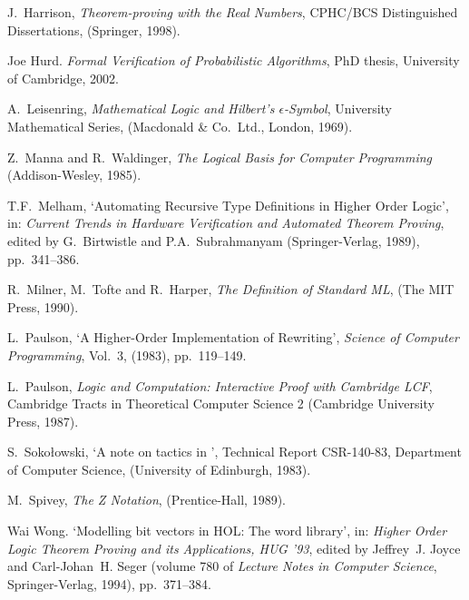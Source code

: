 \begin{thebibliography}{99}
J.\ Harrison,
{\it Theorem-proving with the Real Numbers},
{\rm CPHC/BCS Distinguished Dissertations},
(Springer, 1998).

Joe Hurd.
{\it Formal Verification of Probabilistic Algorithms},
{\rm PhD thesis, University of Cambridge, 2002}.

A.\ Leisenring,
{\it Mathematical Logic and Hilbert's $\epsilon$-Symbol\/},
{\rm University Mathematical Series},
(Macdonald \& Co.\ Ltd., London, 1969).

Z.\ Manna and R.\ Waldinger,
{\it The Logical Basis for Computer Programming\/}
(Addison-Wesley, 1985).

T{}.F{}.\ Melham, `{}Automating Recursive Type Definitions
in Higher Order Logic',
in: {\it Current Trends in Hardware Verification and
Automated Theorem Proving\/}, edited by G.\ Birtwistle
and P.A.\ Subrahmanyam
(Springer-Verlag, 1989), pp.\ 341--386.

R.\ Milner, M.\ Tofte and R.\ Harper,
{\it The Definition of Standard ML\/},
(The MIT Press, 1990).

L.\ Paulson,
`{}A Higher-Order Implementation of Rewriting',
{\it Science of Computer Programming}, Vol.\ 3, (1983), pp.\ 119--149.

 L.\ Paulson,
{\it Logic and Computation: Interactive Proof with Cambridge LCF},
Cambridge Tracts in Theoretical Computer Science 2
(Cambridge University Press, 1987).

%
S.\ Soko\l owski, `{}A note on tactics in \LCF',
Technical Report CSR-140-83, Department of Computer Science,
(University of Edinburgh, 1983).


M.\ Spivey,
{\it The Z Notation}, (Prentice-Hall, 1989).

Wai Wong.
`Modelling bit vectors in {HOL}: The word library',
in: {\em Higher
  Order Logic Theorem Proving and its Applications, {HUG} '93}, edited
by Jeffrey~J. Joyce and Carl-Johan~H. Seger (volume 780 of
  {\em Lecture Notes in Computer Science}, Springer-Verlag, 1994),
  pp.~371--384.


\end{thebibliography}



